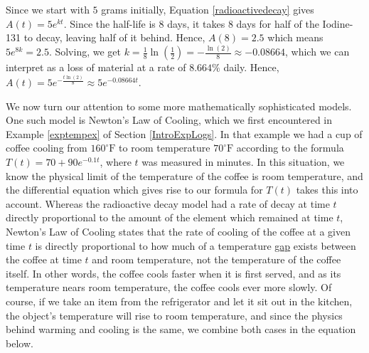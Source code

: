\medskip 

{ Since we start with $5$ grams initially, Equation \ref{radioactivedecay} gives $A(t) = 5e^{kt}$.  Since the half-life is $8$ days, it takes $8$ days for half of the Iodine-131 to decay, leaving half of it behind.  Hence, $A(8) = 2.5$ which means $5e^{8k} = 2.5$.  Solving, we get $k = \frac{1}{8} \ln\left(\frac{1}{2}\right) = -\frac{\ln(2)}{8} \approx -0.08664$, which we can interpret as a loss of material at a rate of $8.664 \%$ daily.  Hence, $A(t) = 5 e^{-\frac{t\ln(2)}{8}} \approx 5 e^{-0.08664t}$. }

\medskip

We now turn our attention to some more mathematically sophisticated models.  One such model is Newton's Law of Cooling, which we first encountered in Example \ref{exptempex} of Section \ref{IntroExpLogs}.   In that example we had a cup of coffee cooling from $160^{\circ}\mbox{F}$ to room temperature $70^{\circ}\mbox{F}$ according to the formula $T(t) = 70 + 90 e^{-0.1 t}$, where $t$ was measured in minutes.  In this situation, we know the physical limit of the temperature of the coffee is room temperature, and the differential equation which gives rise to our formula for $T(t)$ takes this into account.  Whereas the radioactive decay model had a rate of decay at time $t$ directly proportional to the amount of the element which remained at time $t$, Newton's Law of Cooling states that the rate of cooling of the coffee at a given time $t$ is directly proportional to how much of a temperature \underline{gap} exists between the coffee at time $t$ and room temperature, not the temperature of the coffee itself.  In other words, the coffee cools faster when it is first served, and as its temperature nears room temperature, the coffee cools ever more slowly.  Of course, if we take an item from the refrigerator and let it sit out in the kitchen, the object's temperature will rise to room temperature, and since the physics behind warming and cooling is the same, we combine both cases in the equation below.

